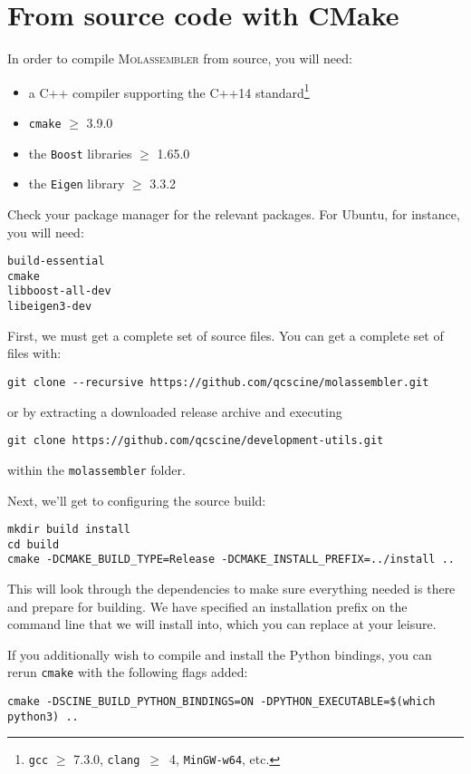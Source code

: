 \documentclass[]{tufte-book}
\begin{document}
\section{From source code with CMake}
In order to compile \textsc{Molassembler} from source, you will need:
\begin{itemize}
  \item a C++ compiler supporting the C++14 standard\footnote{\texttt{gcc} $\ge$
    7.3.0, \texttt{clang}~$\ge$~4, \texttt{MinGW-w64}, etc.}
  \item \texttt{cmake} $\ge$ 3.9.0
  \item the \texttt{Boost} libraries $\ge$ 1.65.0
  \item the \texttt{Eigen} library $\ge$ 3.3.2
\end{itemize}

Check your package manager for the relevant packages. For Ubuntu, for instance,
you will need:

\begin{Verbatim}
build-essential
cmake
libboost-all-dev
libeigen3-dev
\end{Verbatim}

First, we must get a complete set of source files. You can get a complete set of
files with:
\begin{Verbatim}
git clone --recursive https://github.com/qcscine/molassembler.git
\end{Verbatim} 
or by extracting a downloaded
release archive and executing 
\begin{Verbatim}
git clone https://github.com/qcscine/development-utils.git
\end{Verbatim}
within the \texttt{molassembler} folder.

Next, we'll get to configuring the source build:

\begin{Verbatim}
mkdir build install
cd build
cmake -DCMAKE_BUILD_TYPE=Release -DCMAKE_INSTALL_PREFIX=../install ..
\end{Verbatim}

This will look through the dependencies to make sure everything needed is there
and prepare for building. We have specified an installation prefix on the
command line that we will install into, which you can replace at your leisure.

If you additionally wish to compile and install the Python bindings, you can
rerun \texttt{cmake} with the following flags added:

\begin{Verbatim}
cmake -DSCINE_BUILD_PYTHON_BINDINGS=ON -DPYTHON_EXECUTABLE=$(which python3) ..
\end{Verbatim}
\end{document}
